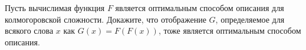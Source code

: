 Пусть вычислимая функция $F$ является оптимальным способом описания для колмогоровской
сложности. Докажите, что отображение $G$, определяемое для всякого слова $x$ как $G(x) = F(F(x))$, тоже
является оптимальным способом описания.